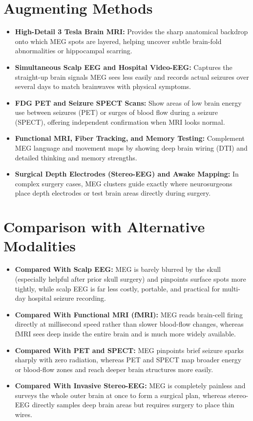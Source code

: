 \section{Augmenting Methods}
\begin{itemize}
  \item \textbf{High-Detail 3 Tesla Brain MRI:} Provides the sharp anatomical backdrop onto which MEG spots are layered, helping uncover subtle brain-fold abnormalities or hippocampal scarring.
  \item \textbf{Simultaneous Scalp EEG and Hospital Video-EEG:} Captures the straight-up brain signals MEG sees less easily and records actual seizures over several days to match brainwaves with physical symptoms.
  \item \textbf{FDG PET and Seizure SPECT Scans:} Show areas of low brain energy use between seizures (PET) or surges of blood flow during a seizure (SPECT), offering independent confirmation when MRI looks normal.
  \item \textbf{Functional MRI, Fiber Tracking, and Memory Testing:} Complement MEG language and movement maps by showing deep brain wiring (DTI) and detailed thinking and memory strengths.
  \item \textbf{Surgical Depth Electrodes (Stereo-EEG) and Awake Mapping:} In complex surgery cases, MEG clusters guide exactly where neurosurgeons place depth electrodes or test brain areas directly during surgery.
\end{itemize}

\section{Comparison with Alternative Modalities}
\begin{itemize}
  \item \textbf{Compared With Scalp EEG:} MEG is barely blurred by the skull (especially helpful after prior skull surgery) and pinpoints surface spots more tightly, while scalp EEG is far less costly, portable, and practical for multi-day hospital seizure recording.
  \item \textbf{Compared With Functional MRI (fMRI):} MEG reads brain-cell firing directly at millisecond speed rather than slower blood-flow changes, whereas fMRI sees deep inside the entire brain and is much more widely available.
  \item \textbf{Compared With PET and SPECT:} MEG pinpoints brief seizure sparks sharply with zero radiation, whereas PET and SPECT map broader energy or blood-flow zones and reach deeper brain structures more easily.
  \item \textbf{Compared With Invasive Stereo-EEG:} MEG is completely painless and surveys the whole outer brain at once to form a surgical plan, whereas stereo-EEG directly samples deep brain areas but requires surgery to place thin wires.
\end{itemize}

